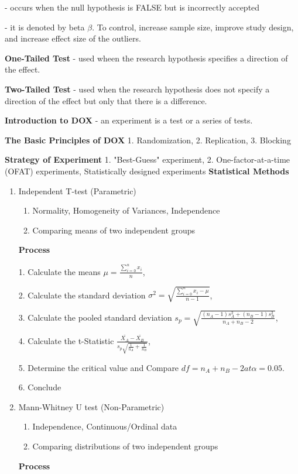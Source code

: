 \documentclass[6pt]{article}
\begin{document}
\begin{multicols*}{2}
    - occurs when the null hypothesis is FALSE but is incorrectly accepted

    - it is denoted by beta $\beta$. To control, increase sample size, improve study design, and increase effect size of the outliers.
    
    \textbf{One-Tailed Test} - used wheen the research hypothesis specifies a direction of the effect.

    \textbf{Two-Tailed Test} - used when the research hypothesis does not specify a direction of the effect but only that there is a difference.
    
    \textbf{Introduction to DOX} - an experiment is a test or a series of tests.

    \textbf{The Basic Principles of DOX}
    1. Randomization, 2. Replication, 3. Blocking

    \textbf{Strategy of Experiment}
    1. "Best-Guess" experiment, 2. One-factor-at-a-time (OFAT) experiments, Statistically designed experiments
    \textbf{Statistical Methods}

    \begin{enumerate}
        \item Independent T-test (Parametric)
        \begin{enumerate}
            \item Normality, Homogeneity of Variances, Independence
            \item Comparing means of two independent groups
        \end{enumerate}
        \textbf{Process}

            1. Calculate the means $\displaystyle \mu = \frac{\sum_{i=0}^{n}{x_i}}{n}$,

            2. Calculate the standard deviation $\displaystyle \sigma^2 = \sqrt{\frac{\sum_{i=0}^{n}{x_i - \mu}}{n-1}}$, 

            3. Calculate the pooled standard deviation $\displaystyle s_p = \sqrt{\frac{(n_A-1)s_A^2+(n_B-1)s_B^2}{n_A+n_B-2}}$, 

            4. Calculate the t-Statistic $\displaystyle \frac{\bar{X_A} - \bar{X_B}}{s_p\sqrt{\frac{1}{n_A}+\frac{1}{n_B}}}$,

            5. Determine the critical value and Compare $df = n_A + n_B - 2 at \alpha = 0.05$.

            6. Conclude


        \item Mann-Whitney U test (Non-Parametric)
        \begin{enumerate}
            \item Independence, Continuous/Ordinal data
            \item Comparing distributions of two independent groups
        \end{enumerate}
        \textbf{Process}


\end{enumerate}
\end{multicols*}
\end{document}
